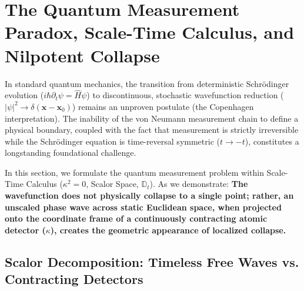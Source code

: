 \section{The Quantum Measurement Paradox, Scale-Time Calculus, and Nilpotent Collapse}
\label{sec:kuantum_olcum_main}

In standard quantum mechanics, the transition from deterministic Schrödinger evolution ($i\hbar \partial_t \psi = \hat{H}\psi$) to discontinuous, stochastic wavefunction reduction ($|\psi|^2 \to \delta(\mathbf{x} - \mathbf{x}_0)$) remains an unproven postulate (the Copenhagen interpretation). The inability of the von Neumann measurement chain to define a physical boundary, coupled with the fact that measurement is strictly irreversible while the Schrödinger equation is time-reversal symmetric ($t \to -t$), constitutes a longstanding foundational challenge.

In this section, we formulate the quantum measurement problem within Scale-Time Calculus ($\kappa^2 = 0$, Scalor Space, $\mathbb{D}_t$). As we demonstrate: \textbf{The wavefunction does not physically collapse to a single point; rather, an unscaled phase wave across static Euclidean space, when projected onto the coordinate frame of a continuously contracting atomic detector ($\kappa$), creates the geometric appearance of localized collapse.}

\subsection{Scalor Decomposition: Timeless Free Waves vs. Contracting Detectors}
\label{sec:skalor_ayrisimi}

